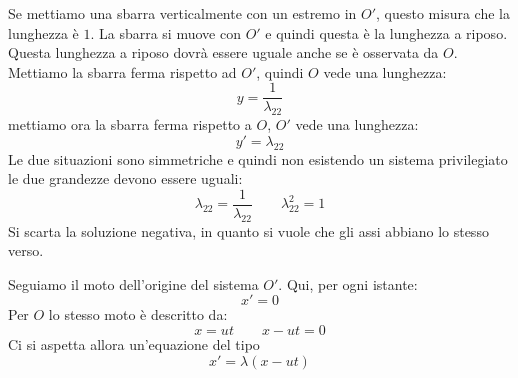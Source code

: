 Se mettiamo una sbarra verticalmente con un estremo in $O'$, questo misura che la lunghezza è $1$. La sbarra si muove con $O'$ e quindi questa è la lunghezza a riposo. Questa lunghezza a riposo dovrà essere uguale anche se è osservata da $O$. Mettiamo la sbarra ferma rispetto ad $O'$, quindi $O$ vede una lunghezza:
\[y=\frac{1}{\lambda_{22}}\]
mettiamo ora la sbarra ferma rispetto a $O$, $O'$ vede una lunghezza:
\[y'=\lambda_{22}\]
Le due situazioni sono simmetriche e quindi non esistendo un sistema privilegiato le due grandezze devono essere uguali:
\[\lambda_{22}=\frac{1}{\lambda_{22}}\qquad\lambda^2_{22}=1\]
Si scarta la soluzione negativa, in quanto si vuole che gli assi abbiano lo stesso verso.


\parbox[]{\textwidth}{
   Seguiamo il moto dell'origine del sistema $O'$. Qui, per ogni istante:
   \[x'=0\]
   Per $O$ lo stesso moto è descritto da:
   \[x=ut\qquad x-ut=0\]
   Ci si aspetta allora un'equazione del tipo
   \[x'=\lambda(x-ut)\]
}

